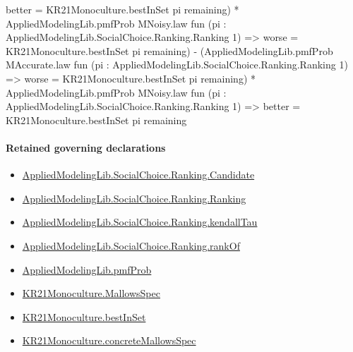\documentclass[10pt]{article}
\begin{document}
\begin{ReviewVerbatim}
                                      better = KR21Monoculture.bestInSet pi remaining) *
                                    AppliedModelingLib.pmfProb MNoisy.law
                                      fun (pi : AppliedModelingLib.SocialChoice.Ranking.Ranking 1) =>
                                      worse = KR21Monoculture.bestInSet pi remaining) -
                                  (AppliedModelingLib.pmfProb MAccurate.law
                                      fun (pi : AppliedModelingLib.SocialChoice.Ranking.Ranking 1) =>
                                      worse = KR21Monoculture.bestInSet pi remaining) *
                                    AppliedModelingLib.pmfProb MNoisy.law
                                      fun (pi : AppliedModelingLib.SocialChoice.Ranking.Ranking 1) =>
                                      better = KR21Monoculture.bestInSet pi remaining
\end{ReviewVerbatim}

\paragraph{Retained governing declarations}
\begin{itemize}\raggedright
\item \hyperlink{library-prerequisite-8c0e6c25845ae78a}{Applied\allowbreak{}Modeling\allowbreak{}Lib.\allowbreak{}Social\allowbreak{}Choice.\allowbreak{}Ranking.\allowbreak{}Candidate}
\item \hyperlink{library-prerequisite-5cde54446d1ae021}{Applied\allowbreak{}Modeling\allowbreak{}Lib.\allowbreak{}Social\allowbreak{}Choice.\allowbreak{}Ranking.\allowbreak{}Ranking}
\item \hyperlink{governing-declaration-127efd44d176e2ba}{Applied\allowbreak{}Modeling\allowbreak{}Lib.\allowbreak{}Social\allowbreak{}Choice.\allowbreak{}Ranking.\allowbreak{}kendall\allowbreak{}Tau}
\item \hyperlink{governing-declaration-ef804e95c0f14f7c}{Applied\allowbreak{}Modeling\allowbreak{}Lib.\allowbreak{}Social\allowbreak{}Choice.\allowbreak{}Ranking.\allowbreak{}rank\allowbreak{}Of}
\item \hyperlink{governing-declaration-9c38d53b9d664221}{Applied\allowbreak{}Modeling\allowbreak{}Lib.\allowbreak{}pmf\allowbreak{}Prob}
\item \hyperlink{governing-declaration-b2e6ec0602659b07}{KR21\allowbreak{}Monoculture.\allowbreak{}Mallows\allowbreak{}Spec}
\item \hyperlink{governing-declaration-f2dc4b58640ac1df}{KR21\allowbreak{}Monoculture.\allowbreak{}best\allowbreak{}In\allowbreak{}Set}
\item \hyperlink{governing-declaration-0e399c7dd166853c}{KR21\allowbreak{}Monoculture.\allowbreak{}concrete\allowbreak{}Mallows\allowbreak{}Spec}
\end{itemize}
\end{document}
